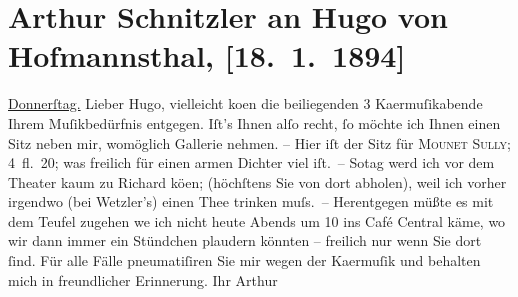 

         
         \renewcommand{\erwaehntePersonen}{Personen: Richard Beer-Hofmann, Hugo von Hofmannsthal, Jean Mounet-Sully, Bernhard Wetzler}
         \renewcommand{\erwaehnteOrte}{Orte: Café Central, Wien}
         \renewcommand{\erwaehnteWerke}{}
               \section[Arthur Schnitzler an Hugo von Hofmannsthal, {[}18. 1. 1894{]}]{ Arthur Schnitzler an Hugo von Hofmannsthal, {[}18. 1. 1894{]}}\nopagebreak{}\rehead{ }\begin{ledgroupsized}[t]{13cm}\normalsize\beginnumbering{} \toendnotes[C]{\smallbreak\pagebreak[2]} 
\pstart
           \raggedleft{}{\pb}\uline{Donnerſtag.}\pend
           \pstart{}Lieber Hugo,\pend\pstart
           vielleicht ko{\geminationm}en die beiliegenden 3 Ka{\geminationm}ermuſikabende Ihrem Muſikbedürfnis entgegen. Iſt’s
               Ihnen alſo recht, ſo möchte ich Ihnen einen Sitz neben mir, womöglich Gallerie
               nehmen. – Hier iſt der Sitz für {\pb}\textsc{Mounet Sully}; 4 fl. 20; was freilich für einen armen Dichter viel iſt. –\pend
           \pstart
           So{\geminationn}tag werd ich vor dem Theater kaum zu Richard kö{\geminationn}en;
               (höchſtens Sie \introOben{}von dort\introOben{} abholen), weil ich vorher irgendwo
               (bei Wetzler’s) einen Thee trinken muſs. –\pend
           \pstart
           Herentgegen müßte es mit dem Teufel zugehen {\pb}we{\geminationn} ich nicht heute Abends um 10 ins Café Central käme, wo wir dann immer ein Stündchen
               plaudern könnten – freilich nur wenn Sie dort ſind. Für alle Fälle pneumatiſiren Sie
               mir wegen der Ka{\geminationm}ermuſik und behalten mich in
               freundlicher Erinnerung.\pend
           \pstart Ihr \spacefill\mbox{Arthur}\pend{}
         

\end{ledgroupsized}
